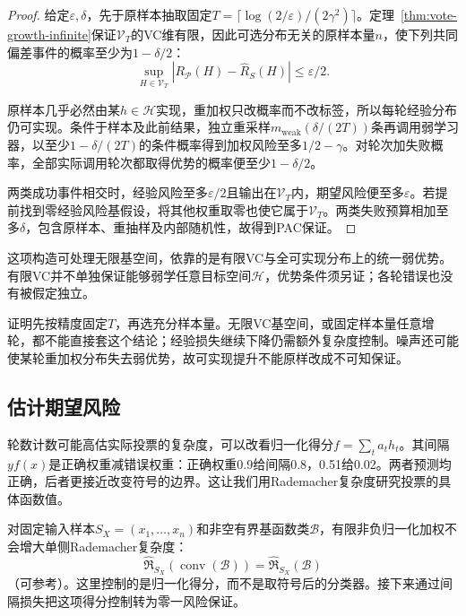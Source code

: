 \begin{proof}
给定$\varepsilon,\delta$，先于原样本抽取固定$T=\lceil\log(2/\varepsilon)/(2\gamma^2)\rceil$。定理~\ref{thm:vote-growth-infinite}保证$\mathcal V_T$的VC维有限，因此可选分布无关的原样本量$n$，使下列共同偏差事件的概率至少为$1-\delta/2$：
\[
 \sup_{H\in\mathcal V_T}|R_{\mathcal P}(H)-\hat R_S(H)|\leq\varepsilon/2.
\]

原样本几乎必然由某$h\in\mathcal H$实现，重加权只改概率而不改标签，所以每轮经验分布仍可实现。条件于样本及此前结果，独立重采样$m_{\mathrm{weak}}(\delta/(2T))$条再调用弱学习器，以至少$1-\delta/(2T)$的条件概率得到加权风险至多$1/2-\gamma$。对轮次加失败概率，全部实际调用轮次都取得优势的概率便至少$1-\delta/2$。

两类成功事件相交时，经验风险至多$\varepsilon/2$且输出在$\mathcal V_T$内，期望风险便至多$\varepsilon$。若提前找到零经验风险基假设，将其他权重取零也使它属于$\mathcal V_T$。两类失败预算相加至多$\delta$，包含原样本、重抽样及内部随机性，故得到PAC保证。
\end{proof}

这项构造可处理无限基空间，依靠的是有限VC与全可实现分布上的统一弱优势。有限VC并不单独保证能够弱学任意目标空间$\mathcal H$，优势条件须另证；各轮错误也没有被假定独立。

证明先按精度固定$T$，再选充分样本量。无限VC基空间，或固定样本量任意增轮，都不能直接套这个结论；经验损失继续下降仍需额外复杂度控制。噪声还可能使某轮重加权分布失去弱优势，故可实现提升不能原样改成不可知保证。

\subsection{估计期望风险}

轮数计数可能高估实际投票的复杂度，可以改看归一化得分$f=\sum_ta_th_t$。其间隔$yf(x)$是正确权重减错误权重：正确权重0.9给间隔0.8，0.51给0.02。两者预测均正确，后者更接近改变符号的边界。这让我们用Rademacher复杂度研究投票的具体函数值。

\label{thm:learning-ensemble-convex-hull}
对固定输入样本$S_X=(x_1,\ldots,x_n)$和非空有界基函数类$\mathcal B$，有限非负归一化加权不会增大单侧Rademacher复杂度：
\[
 \widehat{\mathfrak R}_{S_X}(\operatorname{conv}(\mathcal B))
 =\widehat{\mathfrak R}_{S_X}(\mathcal B)
\]
（可参考）。这里控制的是归一化得分，而不是取符号后的分类器。接下来通过间隔损失把这项得分控制转为零一风险保证。

